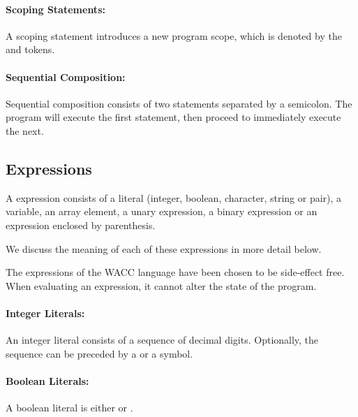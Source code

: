 \documentclass[a4paper]{article}
\theoremstyle{definition}
\begin{document}
\paragraph{Scoping Statements:}
A scoping statement introduces a new program scope, which is denoted by the  and  tokens.

\paragraph{Sequential Composition:}
Sequential composition consists of two statements separated by a semicolon. The program will execute the first statement, then
proceed to immediately execute the next.

\subsection{Expressions}
A expression  consists of
a literal (integer, boolean, character, string or pair),
a variable,
an array element,
a unary expression,
a binary expression
or an expression enclosed by parenthesis.

We discuss the meaning of each of these expressions in more detail below.

The expressions of the WACC language have been chosen to be side-effect free.
When evaluating an expression, it cannot alter the state of the program.

\paragraph{Integer Literals:}
An integer literal  consists of a sequence of decimal digits. 
Optionally, the sequence can be preceded by a \lit{+} or a \lit{-} symbol. 

\paragraph{Boolean Literals:}
A boolean literal  is either  or .
\end{document}
